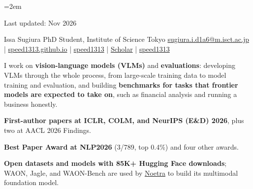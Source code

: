 \documentclass[10pt, a4paper]{article}
\begin{document}
\emergencystretch=2em

\hfill{\footnotesize\color{cvgray}Last updated: Nov 2026}\par\vspace{-6pt}

\cvheader
  {Issa Sugiura}
  {PhD Student, Institute of Science Tokyo}
  {%
    \iconmail\enspace\href{mailto:sugiura.i.d1a6@m.isct.ac.jp}{sugiura.i.d1a6@m.isct.ac.jp}
    \enspace\textcolor{cvgray}{|}\enspace
    \iconglobe\enspace\href{https://speed1313.github.io}{speed1313.github.io}
    \enspace\textcolor{cvgray}{|}\enspace
    \icongithub\enspace\href{https://github.com/speed1313}{speed1313}
    \enspace\textcolor{cvgray}{|}\enspace
    \iconscholar\enspace\href{https://scholar.google.com/citations?user=717QdNoAAAAJ}{Scholar}
    \enspace\textcolor{cvgray}{|}\enspace
    \iconlinkedin\enspace\href{https://www.linkedin.com/in/speed1313}{speed1313}
  }


{\small
I work on \textbf{vision-language models (VLMs)} and \textbf{evaluations}: developing VLMs through the whole
process, from large-scale training data to model training and evaluation, and building \textbf{benchmarks for tasks
that frontier models are expected to take on}, such as financial analysis and running a business honestly.
}


\begin{cvhighlights}
  \item \textbf{First-author papers at ICLR, COLM, and NeurIPS (E\&D) 2026}, plus two at AACL 2026 Findings.
  \item \textbf{Best Paper Award at NLP2026} (3/789, top 0.4\%) and four other awards.
  \item \textbf{Open datasets and models with 85K+ Hugging Face downloads}; WAON, Jagle, and WAON-Bench are used by
        \href{https://zenn.dev/noetra_techblog/articles/0cea39ce67d2c2}{Noetra} to build its multimodal foundation model.
\end{cvhighlights}
\end{document}
